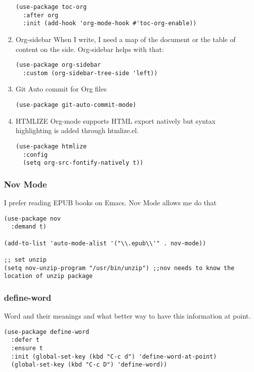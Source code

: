 \documentclass[11pt]{article}
\begin{document}
\begin{enumerate}
\begin{verbatim}
(use-package toc-org
  :after org
  :init (add-hook 'org-mode-hook #'toc-org-enable))
\end{verbatim}

\item Org-sidebar
\label{sec:org28e5f01}
When I write, I need a map of the document or the table of content on the side. Org-sidebar helps with that:

\begin{verbatim}
(use-package org-sidebar
  :custom (org-sidebar-tree-side 'left))
\end{verbatim}

\item Git Auto commit for Org files
\label{sec:org4910dc3}
\begin{verbatim}
(use-package git-auto-commit-mode)
\end{verbatim}

\item HTMLIZE
\label{sec:orgf014037}
Org-mode supports HTML export natively but syntax highlighting is added through htmlize.el.  
\begin{verbatim}
(use-package htmlize
  :config
  (setq org-src-fontify-natively t))
\end{verbatim}
\end{enumerate}


\subsubsection{Nov Mode}
\label{sec:org75e3339}
I prefer reading EPUB books on Emacs. Nov Mode allows me do that

\begin{verbatim}
(use-package nov 
  :demand t)

(add-to-list 'auto-mode-alist '("\\.epub\\'" . nov-mode))

;; set unzip
(setq nov-unzip-program "/usr/bin/unzip") ;;nov needs to know the location of unzip package
\end{verbatim}

\subsubsection{define-word}
\label{sec:org12521a7}
Word and their meanings and what better way to have this information at point. 

\begin{verbatim}
(use-package define-word
  :defer t
  :ensure t
  :init (global-set-key (kbd "C-c d") 'define-word-at-point)
  (global-set-key (kbd "C-c D") 'define-word))

\end{verbatim}
\end{document}
